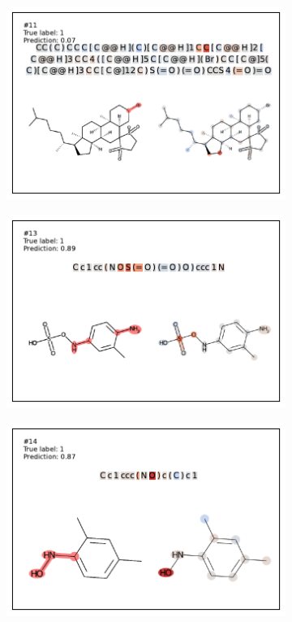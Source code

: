 \begin{figure}
\begin{subfigure}[b]{0.33\textwidth}
\end{subfigure} 
\begin{subfigure}[b]{0.33\textwidth} 
  \centering 
  \includegraphics[width=\textwidth]{figures/ames/ames11.pdf} 
\end{subfigure}\begin{subfigure}[b]{0.33\textwidth} 
  \centering 
  \includegraphics[width=\textwidth]{figures/ames/ames13.pdf} 
\end{subfigure}\begin{subfigure}[b]{0.33\textwidth} 
  \centering 
  \includegraphics[width=\textwidth]{figures/ames/ames14.pdf} 

\end{subfigure}
\end{figure}
